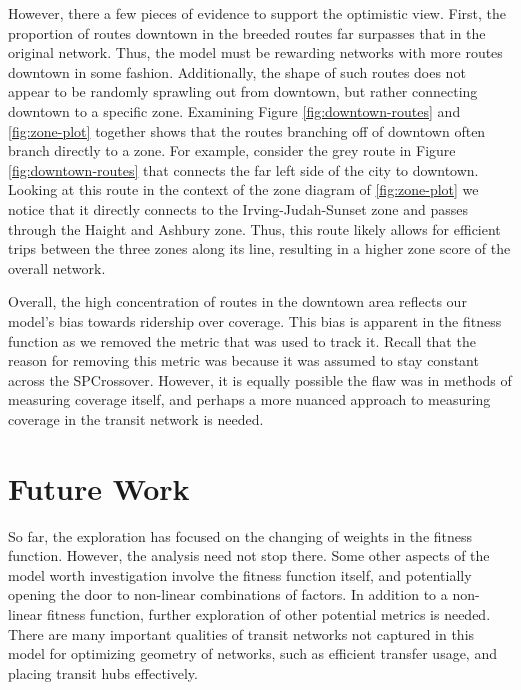 \documentclass[11pt]{amsart}
\theoremstyle{definition}                  %
\theoremstyle{remark}                       %
\numberwithin{equation}{section}
\begin{document}
However, there a few pieces of evidence to support the optimistic view. First, the proportion of routes downtown in the breeded routes far surpasses that in the original network. Thus, the model must be rewarding networks with more routes downtown in some fashion. Additionally, the shape of such routes does not appear to be randomly sprawling out from downtown, but rather connecting downtown to a specific zone. Examining Figure \ref{fig:downtown-routes} and \ref{fig:zone-plot} together shows that the routes branching off of downtown often branch directly to a zone. For example, consider the grey route in Figure \ref{fig:downtown-routes} that connects the far left side of the city to downtown. Looking at this route in the context of the zone diagram of \ref{fig:zone-plot} we notice that it directly connects to the Irving-Judah-Sunset zone and passes through the Haight and Ashbury zone. Thus, this route likely allows for efficient trips between the three zones along its line, resulting in a higher zone score of the overall network. 

Overall, the high concentration of routes in the downtown area reflects our model's bias towards ridership over coverage. This bias is apparent in the fitness function as we removed the metric that was used to track it. Recall that the reason for removing this metric was because it was assumed to stay constant across the SPCrossover. However, it is equally possible the flaw was in methods of measuring coverage itself, and perhaps a more nuanced approach to measuring coverage in the transit network is needed. 

\section{Future Work}
So far, the exploration has focused on the changing of weights in the fitness function. However, the analysis need not stop there. Some other aspects of the model worth investigation involve the fitness function itself, and potentially opening the door to non-linear combinations of factors. In addition to a non-linear fitness function, further exploration of other potential metrics is needed. There are many important qualities of transit networks not captured in this model for optimizing geometry of networks, such as efficient transfer usage, and placing transit hubs effectively. 
\end{document}
